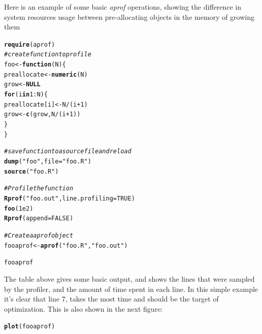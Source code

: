 \documentclass{article}\usepackage[]{graphicx}\usepackage[]{color}
\makeatletter
\newcommand{\hlnum}[1]{\textcolor[rgb]{0.686,0.059,0.569}{#1}}%
\newcommand{\hlstr}[1]{\textcolor[rgb]{0.192,0.494,0.8}{#1}}%
\newcommand{\hlcom}[1]{\textcolor[rgb]{0.678,0.584,0.686}{\textit{#1}}}%
\newcommand{\hlopt}[1]{\textcolor[rgb]{0,0,0}{#1}}%
\newcommand{\hlstd}[1]{\textcolor[rgb]{0.345,0.345,0.345}{#1}}%
\newcommand{\hlkwa}[1]{\textcolor[rgb]{0.161,0.373,0.58}{\textbf{#1}}}%
\newcommand{\hlkwb}[1]{\textcolor[rgb]{0.69,0.353,0.396}{#1}}%
\newcommand{\hlkwc}[1]{\textcolor[rgb]{0.333,0.667,0.333}{#1}}%
\newcommand{\hlkwd}[1]{\textcolor[rgb]{0.737,0.353,0.396}{\textbf{#1}}}%
\newenvironment{kframe}{%
 \def\at@end@of@kframe{}%
 \ifinner\ifhmode%
  \def\at@end@of@kframe{\end{minipage}}%
  \begin{minipage}{\columnwidth}%
 \fi\fi%
 \def\FrameCommand##1{\hskip\@totalleftmargin \hskip-\fboxsep
 \colorbox{shadecolor}{##1}\hskip-\fboxsep
     \hskip-\linewidth \hskip-\@totalleftmargin \hskip\columnwidth}%
 \MakeFramed {\advance\hsize-\width
   \@totalleftmargin\z@ \linewidth\hsize
   \@setminipage}}%
 {\par\unskip\endMakeFramed%
 \at@end@of@kframe}
\newenvironment{knitrout}{}{} %
\makeatother
\begin{document}
\clearpage


Here is an example of some basic \textit{aprof} operations, showing the difference in system resources usage between pre-allocating objects in the memory of growing them

\begin{knitrout}
\color{fgcolor}\begin{kframe}
\begin{alltt}
\hlkwd{require}\hlstd{(aprof)}
\hlcom{# create function to profile}
     \hlstd{foo} \hlkwb{<-} \hlkwa{function}\hlstd{(}\hlkwc{N}\hlstd{)\{}
             \hlstd{preallocate}\hlkwb{<-}\hlkwd{numeric}\hlstd{(N)}
             \hlstd{grow}\hlkwb{<-}\hlkwa{NULL}
              \hlkwa{for}\hlstd{(i} \hlkwa{in} \hlnum{1}\hlopt{:}\hlstd{N)\{}
                  \hlstd{preallocate[i]}\hlkwb{<-}\hlstd{N}\hlopt{/}\hlstd{(i}\hlopt{+}\hlnum{1}\hlstd{)}
                  \hlstd{grow}\hlkwb{<-}\hlkwd{c}\hlstd{(grow,N}\hlopt{/}\hlstd{(i}\hlopt{+}\hlnum{1}\hlstd{))}
                 \hlstd{\}}
            \hlstd{\}}

     \hlcom{#save function to a source file and reload}
     \hlkwd{dump}\hlstd{(}\hlstr{"foo"}\hlstd{,}\hlkwc{file}\hlstd{=}\hlstr{"foo.R"}\hlstd{)}
     \hlkwd{source}\hlstd{(}\hlstr{"foo.R"}\hlstd{)}


     \hlcom{# Profile the function}
     \hlkwd{Rprof}\hlstd{(}\hlstr{"foo.out"}\hlstd{,}\hlkwc{line.profiling}\hlstd{=}\hlnum{TRUE}\hlstd{)}
     \hlkwd{foo}\hlstd{(}\hlnum{1e2}\hlstd{)}
     \hlkwd{Rprof}\hlstd{(}\hlkwc{append}\hlstd{=}\hlnum{FALSE}\hlstd{)}

     \hlcom{# Create a aprof object}
     \hlstd{fooaprof}\hlkwb{<-}\hlkwd{aprof}\hlstd{(}\hlstr{"foo.R"}\hlstd{,}\hlstr{"foo.out"}\hlstd{)}
\end{alltt}


{\ttfamily\noindent\bfseries\color{errorcolor}{\#\# Error: Rprof outputs appears to be empty, were enough samples made by the profiler?}}\begin{alltt}
     \hlstd{fooaprof}
\end{alltt}


{\ttfamily\noindent\bfseries\color{errorcolor}{\#\# Error: object 'fooaprof' not found}}\end{kframe}
\end{knitrout}

The table above gives some basic output, and shows the lines that were sampled by the profiler, and the amount of time spent in each line. In this simple example it's clear that line 7, takes the most time and should be the target of optimization. This is also shown in the next figure:

\begin{knitrout}
\color{fgcolor}\begin{kframe}
\begin{alltt}
\hlkwd{plot}\hlstd{(fooaprof)}
\end{alltt}


{\ttfamily\noindent\bfseries\color{errorcolor}{\#\# Error: object 'fooaprof' not found}}\end{kframe}
\end{knitrout}
\end{document}
